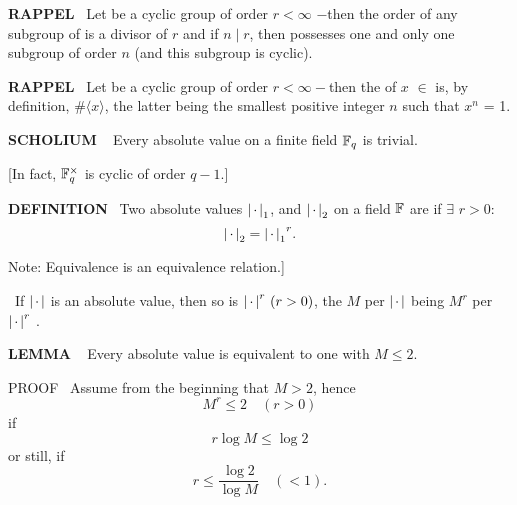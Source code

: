 \begin{x}{\small\bf RAPPEL} \ 
Let \mG be a cyclic group of order $r < \infty$ $-$then the order of any subgroup of \mG is a divisor of $r$ and if $n \mid r$, then \mG possesses one and only one 
subgroup of order $n$ (and this subgroup is cyclic).
\end{x}
\vspace{0.1cm}

\begin{x}{\small\bf RAPPEL} \ 
Let \mG be a cyclic group of order $r < \infty -$then the 
\un{order}
\index{order} 
of $x$ $\in$ \mG is, by definition, 
$\#\langle x \rangle$, the latter being the smallest positive integer $n$ such that $x^n$ = 1.
\end{x}
\vspace{0.1cm}
 
\begin{x}{\small\bf SCHOLIUM} \ %
Every absolute value on a finite field $\mathbb{F}_q$ is trivial.

\vspace{0.1cm}

[In fact, $\mathbb{F}_q^\times$  is cyclic of order $q-1$.]
\end{x}
\vspace{0.1cm}

\begin{x}{\small\bf DEFINITION} \ 
Two absolute values $\left\vert\hspace{0.05cm} \cdot \hspace{0.05cm}\right\vert_1$, and $\left\vert\hspace{0.05cm} \cdot \hspace{0.05cm}\right\vert_2$ on a field $\mathbb{F}$ are 
if $\exists$  $r > 0$:
\[
\left\vert\hspace{0.05cm} \cdot \hspace{0.05cm}\right\vert_2 = {\left\vert\hspace{0.05cm} \cdot \hspace{0.05cm}\right\vert_1}^r.
\]

Note: Equivalence is an equivalence relation.]
\end{x}
\vspace{0.1cm}

\begin{x}{\small\bf {}} \ 
If $\left\vert\hspace{0.05cm} \cdot \hspace{0.05cm}\right\vert$ is an absolute value, then so is ${\left\vert\hspace{0.05cm} \cdot \hspace{0.05cm}\right\vert}^r  \ (r > 0)$, 
the $M$ per $\left\vert\hspace{0.05cm} \cdot \hspace{0.05cm}\right\vert$ being $M^r$ per ${\left\vert\hspace{0.05cm} \cdot \hspace{0.05cm}\right\vert}^r$ .
\end{x}
\vspace{0.1cm}

\begin{x}{\small\bf LEMMA} \ %
Every absolute value is equivalent to one with $M \le 2$.

\vspace{0.1cm}

PROOF \  Assume from the beginning that $M > 2$, hence
\[
M^r \le 2 			\quad \text{$(r > 0)$}
\]
if 
\[
r \log M \le \log 2
\]
or still, if
\[
r  \le \frac{\log 2}{\log M}			\quad (< 1).
\]
\end{x}
\vspace{0.1cm}

